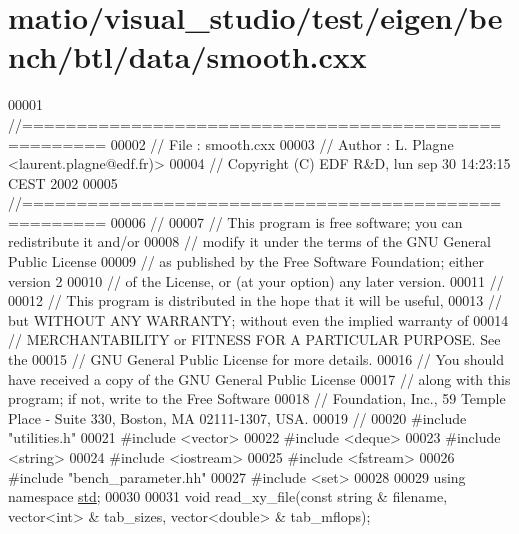 \hypertarget{matio_2visual__studio_2test_2eigen_2bench_2btl_2data_2smooth_8cxx_source}{}\section{matio/visual\+\_\+studio/test/eigen/bench/btl/data/smooth.cxx}
\label{matio_2visual__studio_2test_2eigen_2bench_2btl_2data_2smooth_8cxx_source}

\begin{DoxyCode}
00001 \textcolor{comment}{//=====================================================}
00002 \textcolor{comment}{// File   :  smooth.cxx}
00003 \textcolor{comment}{// Author :  L. Plagne <laurent.plagne@edf.fr)>        }
00004 \textcolor{comment}{// Copyright (C) EDF R&D,  lun sep 30 14:23:15 CEST 2002}
00005 \textcolor{comment}{//=====================================================}
00006 \textcolor{comment}{// }
00007 \textcolor{comment}{// This program is free software; you can redistribute it and/or}
00008 \textcolor{comment}{// modify it under the terms of the GNU General Public License}
00009 \textcolor{comment}{// as published by the Free Software Foundation; either version 2}
00010 \textcolor{comment}{// of the License, or (at your option) any later version.}
00011 \textcolor{comment}{// }
00012 \textcolor{comment}{// This program is distributed in the hope that it will be useful,}
00013 \textcolor{comment}{// but WITHOUT ANY WARRANTY; without even the implied warranty of}
00014 \textcolor{comment}{// MERCHANTABILITY or FITNESS FOR A PARTICULAR PURPOSE.  See the}
00015 \textcolor{comment}{// GNU General Public License for more details.}
00016 \textcolor{comment}{// You should have received a copy of the GNU General Public License}
00017 \textcolor{comment}{// along with this program; if not, write to the Free Software}
00018 \textcolor{comment}{// Foundation, Inc., 59 Temple Place - Suite 330, Boston, MA  02111-1307, USA.}
00019 \textcolor{comment}{// }
00020 \textcolor{preprocessor}{#include "utilities.h"}
00021 \textcolor{preprocessor}{#include <vector>}
00022 \textcolor{preprocessor}{#include <deque>}
00023 \textcolor{preprocessor}{#include <string>}
00024 \textcolor{preprocessor}{#include <iostream>}
00025 \textcolor{preprocessor}{#include <fstream>}
00026 \textcolor{preprocessor}{#include "bench\_parameter.hh"}
00027 \textcolor{preprocessor}{#include <set>}
00028 
00029 \textcolor{keyword}{using namespace }\hyperlink{namespacestd}{std};
00030 
00031 \textcolor{keywordtype}{void} read\_xy\_file(\textcolor{keyword}{const} \textcolor{keywordtype}{string} & filename, vector<int> & tab\_sizes, vector<double> & tab\_mflops);

\end{DoxyCode}
